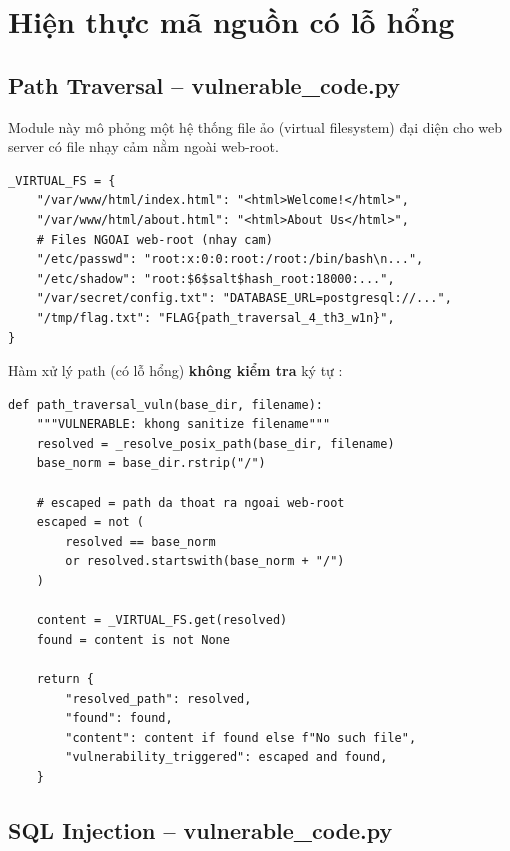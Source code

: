 \documentclass{nt521report}
\begin{document}
\section{Hiện thực mã nguồn có lỗ hổng}
\label{sec:vuln-code}

\subsection{Path Traversal -- vulnerable\_code.py}

Module này mô phỏng một hệ thống file ảo (virtual filesystem) đại diện cho web server có file nhạy cảm nằm ngoài web-root.

\begin{lstlisting}[style=Python, caption={Hệ thống file ảo mô phỏng}]
_VIRTUAL_FS = {
    "/var/www/html/index.html": "<html>Welcome!</html>",
    "/var/www/html/about.html": "<html>About Us</html>",
    # Files NGOAI web-root (nhay cam)
    "/etc/passwd": "root:x:0:0:root:/root:/bin/bash\n...",
    "/etc/shadow": "root:$6$salt$hash_root:18000:...",
    "/var/secret/config.txt": "DATABASE_URL=postgresql://...",
    "/tmp/flag.txt": "FLAG{path_traversal_4_th3_w1n}",
}
\end{lstlisting}

Hàm xử lý path (có lỗ hổng) \textbf{không kiểm tra} ký tự :

\begin{lstlisting}[style=Python, caption={Hàm resolve path có lỗ hổng}, label={lst:resolve-path}]
def path_traversal_vuln(base_dir, filename):
    """VULNERABLE: khong sanitize filename"""
    resolved = _resolve_posix_path(base_dir, filename)
    base_norm = base_dir.rstrip("/")

    # escaped = path da thoat ra ngoai web-root
    escaped = not (
        resolved == base_norm
        or resolved.startswith(base_norm + "/")
    )

    content = _VIRTUAL_FS.get(resolved)
    found = content is not None

    return {
        "resolved_path": resolved,
        "found": found,
        "content": content if found else f"No such file",
        "vulnerability_triggered": escaped and found,
    }
\end{lstlisting}

\subsection{SQL Injection -- vulnerable\_code.py}
\end{document}
